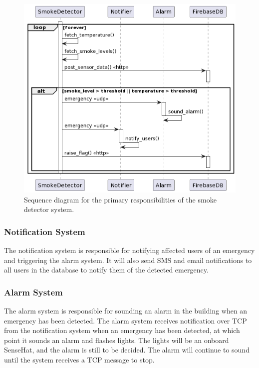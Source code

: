 \begin{figure}[H]
    \centering
    \includegraphics[width=5in]{../assets/SmokeDetectorSequence.png}
    \caption{Sequence diagram for the primary responsibilities of the smoke detector system.}
    \label{fig:smoke-detector-sq}
\end{figure}

\subsubsection{Notification System}

The notification system is responsible for notifying affected users of an emergency and triggering the alarm system. It
will also send SMS and email notifications to all users in the database to notify them of the detected emergency.

\subsubsection{Alarm System}

The alarm system is responsible for sounding an alarm in the building when an emergency has been detected. The alarm
system receives notification over TCP from the notification system when an emergency has been detected, at which point
it sounds an alarm and flashes lights. The lights will be an onboard SenseHat, and the alarm is still to be decided.
The alarm will continue to sound until the system receives a TCP message to stop.

